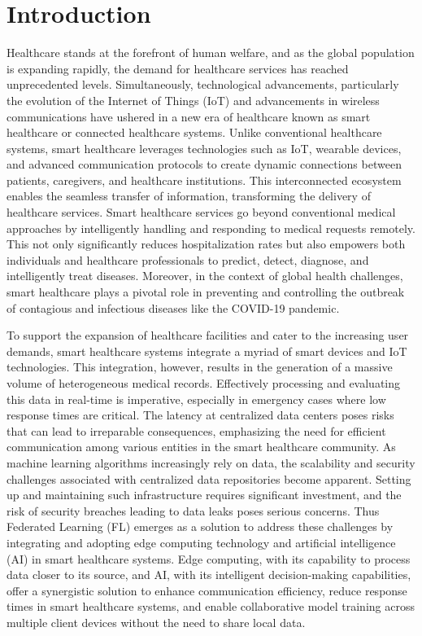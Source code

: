 \documentclass[conference]{IEEEtran}
\begin{document}
\section{Introduction}

Healthcare stands at the forefront of human welfare, and as the global population is expanding rapidly, the demand for healthcare services has reached unprecedented levels. Simultaneously, technological advancements, particularly the evolution of the Internet of Things (IoT) and advancements in wireless communications have ushered in a new era of healthcare known as smart healthcare\cite{1} or connected healthcare systems. Unlike conventional healthcare systems, smart healthcare leverages technologies such as IoT, wearable devices, and advanced communication protocols to create dynamic connections between patients, caregivers, and healthcare institutions. This interconnected ecosystem enables the seamless transfer of information, transforming the delivery of healthcare services. Smart healthcare services go beyond conventional medical approaches by intelligently handling and responding to medical requests remotely. This not only significantly reduces hospitalization rates but also empowers both individuals and healthcare professionals to predict, detect, diagnose, and intelligently treat diseases. Moreover, in the context of global health challenges, smart healthcare plays a pivotal role in preventing and controlling the outbreak of contagious and infectious diseases like the COVID-19 pandemic.

To support the expansion of healthcare facilities and cater to the increasing user demands, smart healthcare systems integrate a myriad of smart devices and IoT technologies. This integration, however, results in the generation of a massive volume of heterogeneous medical records. Effectively processing and evaluating this data in real-time is imperative, especially in emergency cases where low response times are critical. The latency at centralized data centers poses risks that can lead to irreparable consequences, emphasizing the need for efficient communication among various entities in the smart healthcare community. As machine learning algorithms increasingly rely on data, the scalability and security challenges associated with centralized data repositories become apparent. Setting up and maintaining such infrastructure requires significant investment, and the risk of security breaches leading to data leaks poses serious concerns. Thus Federated Learning (FL) emerges as a solution to address these challenges by integrating and adopting edge computing technology and artificial intelligence (AI)\cite{2} in smart healthcare systems. Edge computing, with its capability to process data closer to its source, and AI, with its intelligent decision-making capabilities, offer a synergistic solution to enhance communication efficiency, reduce response times in smart healthcare systems, and enable collaborative model training across multiple client devices without the need to share local data. 
\end{document}
